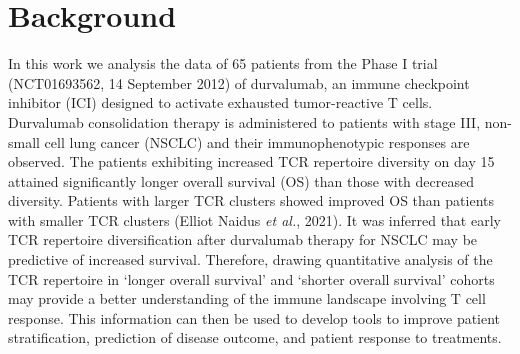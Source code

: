 \section{Background}\label{sec:background}
In this work we analysis the data of 65 patients from the Phase I trial (NCT01693562, 14 September 2012)  of durvalumab, an immune checkpoint inhibitor (ICI) designed to activate exhausted tumor-reactive T cells. Durvalumab consolidation therapy is administered to patients with stage III, non-small cell lung cancer (NSCLC) and their immunophenotypic responses are observed. The patients exhibiting increased TCR repertoire diversity on day 15 attained significantly longer overall survival (OS) than those with decreased diversity. Patients with larger TCR clusters showed improved OS than patients with smaller TCR clusters (\cite{lizhang}Elliot Naidus \textit{et al.}, 2021). It was inferred that early TCR repertoire diversification after durvalumab therapy for NSCLC may be predictive of increased survival. Therefore, drawing quantitative analysis of the TCR repertoire in \lq longer overall survival' and \lq shorter overall survival' cohorts may provide a better understanding of the immune landscape involving T cell response. This information can then be used to develop tools to improve patient stratification, prediction of disease outcome, and patient response to treatments.\par

